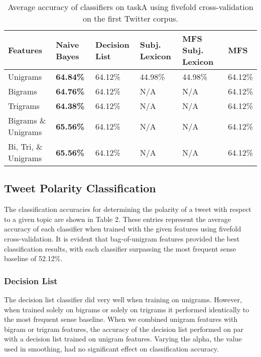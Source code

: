 \documentclass[11pt]{article}
\begin{document}
\begin{table*}[htbp!]
  \centering
  \begin{tabular}{| l || l | l | l | l| l |}
  \hline
  Features & Naive Bayes & Decision List & Subj. Lexicon & MFS Subj. Lexicon & MFS \\ 
  \hline \hline
  Unigrams              & \bf{64.84}\%      & 64.12\% & 44.98\% & 44.98\%
                        & 64.12\% \\  \hline
  Bigrams               & \bf{64.76}\%      & 64.12\%      & N/A      
                        & N/A          & 64.12\% \\  \hline
  Trigrams              & \bf{64.38}\%      & 64.12\%      & N/A          
                        & N/A          & 64.12\% \\  \hline
  Bigrams \& Unigrams   & \bf{65.56\%} & 64.12\%      & N/A          & N/A          & 64.12\% \\  \hline
  Bi, Tri, \& Unigrams  & \bf{65.56\%} & 64.12\%      & N/A          & N/A          & 64.12\% \\  \hline  
  \end{tabular}
  \caption{Average accuracy of classifiers on taskA using fivefold cross-validation on the first Twitter corpus.}
\end{table*}

\subsection{Tweet Polarity Classification}
The classification accuracies for determining the polarity of a tweet with respect to a given topic are shown in Table 2. These entries represent the average accuracy of each classifier when trained with the given features using fivefold cross-validation. It is evident that bag-of-unigram features provided the best classification results, with each classifier surpassing the most frequent sense baseline of 52.12\%.

\subsubsection*{Decision List}
The decision list classifier did very well when training on unigrams. However, when trained solely on bigrams or solely on trigrams it performed identically to the most frequent sense baseline. When we combined unigram features with bigram or trigram features, the accuracy of the decision list performed on par with a decision list trained on unigram features. Varying the alpha, the value used in smoothing, had no significant effect on classification accuracy. 
\end{document}
